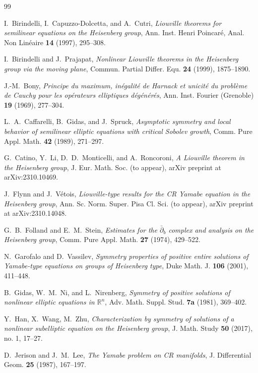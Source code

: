 \documentclass[reqno]{amsart}
\theoremstyle{definition}
\theoremstyle{remark}
\numberwithin{equation}{section}
\begin{document}
\begin{thebibliography}{99}

I.~Birindelli, I.~Capuzzo-Dolcetta, and A.~Cutri,
\emph{Liouville theorems for semilinear equations on the Heisenberg group},
Ann. Inst. Henri Poincaré, Anal. Non Linéaire \textbf{14} (1997), 295--308.

I.~Birindelli and J.~Prajapat,
\emph{Nonlinear Liouville theorems in the Heisenberg group via the moving plane},
Commun. Partial Differ. Equ. \textbf{24} (1999), 1875--1890.

J.-M.~Bony,
\emph{Principe du maximum, inégalité de Harnack et unicité du problème de Cauchy pour les opérateurs elliptiques dégénérés},
Ann. Inst. Fourier (Grenoble) \textbf{19} (1969), 277--304.

L.~A.~Caffarelli, B.~Gidas, and J.~Spruck,
\emph{Asymptotic symmetry and local behavior of semilinear elliptic equations with critical Sobolev growth},
Comm. Pure Appl. Math. \textbf{42} (1989), 271--297.

G.~Catino, Y.~Li, D.~D.~Monticelli, and A.~Roncoroni,
\emph{A Liouville theorem in the Heisenberg group},
J. Eur. Math. Soc. (to appear),
arXiv preprint at arXiv:2310.10469.

J.~Flynn and J.~V\'etois,
\emph{Liouville-type results for the CR Yamabe equation in the Heisenberg group},
Ann. Sc. Norm. Super. Pisa Cl. Sci. (to appear), 
arXiv preprint at arXiv:2310.14048.

G.~B.~Folland and E.~M.~Stein,
\emph{Estimates for the $\bar{\partial}_b$ complex and analysis on the Heisenberg group},
Comm. Pure Appl. Math. \textbf{27} (1974), 429--522.

N.~Garofalo and D.~Vassilev,
\emph{Symmetry properties of positive entire solutions of Yamabe-type equations on groups of Heisenberg type},
Duke Math. J. \textbf{106} (2001), 411--448.

B.~Gidas, W.~M.~Ni, and L.~Nirenberg,
\emph{Symmetry of positive solutions of nonlinear elliptic equations in $\mathbb{R}^n$},
Adv. Math. Suppl. Stud. \textbf{7a} (1981), 369--402.

Y.~Han, X.~Wang, M.~Zhu, 
\emph{Characterization by symmetry of solutions of a nonlinear subelliptic equation on the Heisenberg group},
J. Math. Study \textbf{50} (2017), no. 1, 17--27.

D.~Jerison and J.~M.~Lee,
\emph{The Yamabe problem on CR manifolds},
J. Differential Geom. \textbf{25} (1987), 167--197.


\end{thebibliography}
\end{document}
